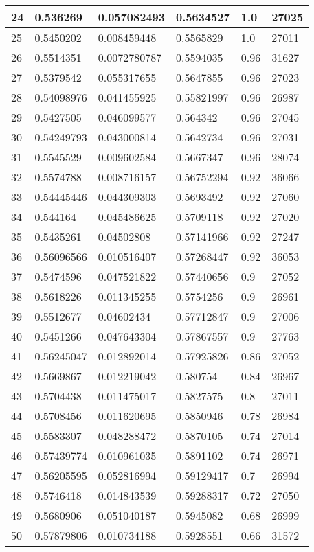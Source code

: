 \begin{longtable}{|l|l|l|l|l|l|}
24 & 0.536269 & 0.057082493 & 0.5634527 & 1.0 & 27025 \\ \hline 
25 & 0.5450202 & 0.008459448 & 0.5565829 & 1.0 & 27011 \\ \hline 
26 & 0.5514351 & 0.0072780787 & 0.5594035 & 0.96 & 31627 \\ \hline 
27 & 0.5379542 & 0.055317655 & 0.5647855 & 0.96 & 27023 \\ \hline 
28 & 0.54098976 & 0.041455925 & 0.55821997 & 0.96 & 26987 \\ \hline 
29 & 0.5427505 & 0.046099577 & 0.564342 & 0.96 & 27045 \\ \hline 
30 & 0.54249793 & 0.043000814 & 0.5642734 & 0.96 & 27031 \\ \hline 
31 & 0.5545529 & 0.009602584 & 0.5667347 & 0.96 & 28074 \\ \hline 
32 & 0.5574788 & 0.008716157 & 0.56752294 & 0.92 & 36066 \\ \hline 
33 & 0.54445446 & 0.044309303 & 0.5693492 & 0.92 & 27060 \\ \hline 
34 & 0.544164 & 0.045486625 & 0.5709118 & 0.92 & 27020 \\ \hline 
35 & 0.5435261 & 0.04502808 & 0.57141966 & 0.92 & 27247 \\ \hline 
36 & 0.56096566 & 0.010516407 & 0.57268447 & 0.92 & 36053 \\ \hline 
37 & 0.5474596 & 0.047521822 & 0.57440656 & 0.9 & 27052 \\ \hline 
38 & 0.5618226 & 0.011345255 & 0.5754256 & 0.9 & 26961 \\ \hline 
39 & 0.5512677 & 0.04602434 & 0.57712847 & 0.9 & 27006 \\ \hline 
40 & 0.5451266 & 0.047643304 & 0.57867557 & 0.9 & 27763 \\ \hline 
41 & 0.56245047 & 0.012892014 & 0.57925826 & 0.86 & 27052 \\ \hline 
42 & 0.5669867 & 0.012219042 & 0.580754 & 0.84 & 26967 \\ \hline 
43 & 0.5704438 & 0.011475017 & 0.5827575 & 0.8 & 27011 \\ \hline 
44 & 0.5708456 & 0.011620695 & 0.5850946 & 0.78 & 26984 \\ \hline 
45 & 0.5583307 & 0.048288472 & 0.5870105 & 0.74 & 27014 \\ \hline 
46 & 0.57439774 & 0.010961035 & 0.5891102 & 0.74 & 26971 \\ \hline 
47 & 0.56205595 & 0.052816994 & 0.59129417 & 0.7 & 26994 \\ \hline 
48 & 0.5746418 & 0.014843539 & 0.59288317 & 0.72 & 27050 \\ \hline 
49 & 0.5680906 & 0.051040187 & 0.5945082 & 0.68 & 26999 \\ \hline 
50 & 0.57879806 & 0.010734188 & 0.5928551 & 0.66 & 31572 \\ \hline 
\end{longtable}